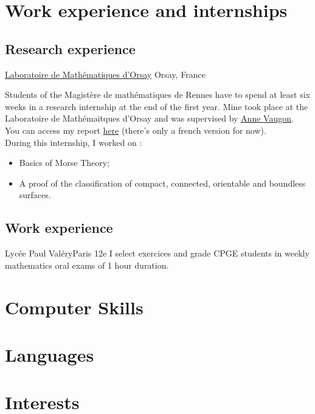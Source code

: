 \documentclass[11pt,letterpaper,sans]{moderncv}
\begin{document}
\section{Work experience and internships}

\subsection{Research experience}
{\href{https://www.imo.universite-paris-saclay.fr/fr/}{Laboratoire de Mathématiques d'Orsay}}
{Orsay, France}{}{
	Students of the Magistère de mathématiques de Rennes have to spend at least six weeks in 
	a research internship at the end of the first year. Mine took place at the Laboratoire de 
	Mathémaitques d'Orsay and was supervised by \href{https://anne.vaugon.vwx.fr/}{Anne Vaugon}.\\
	You can access my report \color{newred} 
	\href{https://perso.eleves.ens-rennes.fr/people/amar.ahmane/src/rapports/stage-l3.pdf}{here} 
	\color{black} (there's only a french version for now).\\
	During this internship, I worked on : 
	\begin{itemize}
		\item Basics of Morse Theory; 
		\item A proof of the classification of compact, connected, orientable and boundless
		surfaces.\\
		\vspace{1em} 
		\begin{center}
			
		\end{center}
	\end{itemize}
}

\subsection{Work experience}
{Lycée Paul Valéry}{Paris 12e}{}{
	I select exercices and grade CPGE students in weekly mathematics oral exams
	of 1 hour duration. 
}


\section{Computer Skills}

\section{Languages}

\section{Interests}
\end{document}
